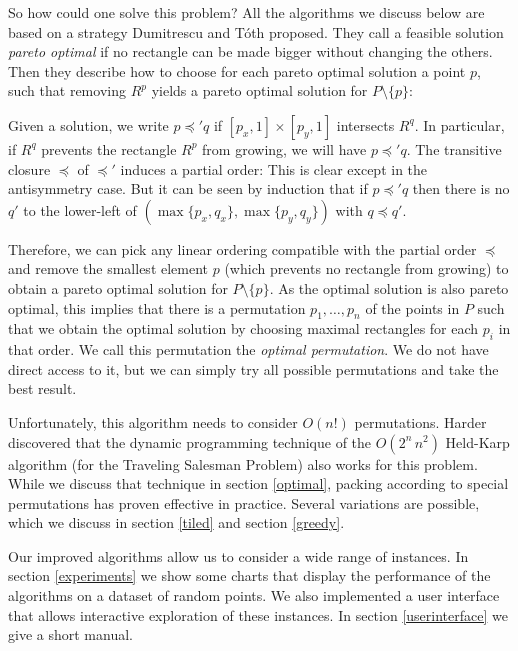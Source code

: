 \documentclass[11pt, a4paper, twocolumn]{article}
\begin{document}
So how could one solve this problem? All the algorithms we discuss below
are based on a strategy Dumitrescu and Tóth \cite{dumitrescu2015packing} proposed.
They call a feasible solution \textit{pareto optimal} if no rectangle can be
made bigger without changing the others.
Then they describe how to choose for each pareto optimal solution a point $p$,
such that removing $R^p$ yields a pareto optimal solution for $P\setminus\{p\}$:

Given a solution, we write $p \preceq' q$ if $[p_x, 1] \times [p_y, 1]$ intersects $R^q$.
In particular, if $R^q$ prevents the rectangle $R^p$ from growing, we will have $p \preceq' q$.
The transitive closure $\preceq$ of $\preceq'$ induces a partial order: This is clear except
in the antisymmetry case. But it can be seen by induction that if $p \preceq' q$ then
there is no $q'$ to the lower-left of $(\max \{p_x, q_x\}, \max \{p_y, q_y\})$ with $q \preceq q'$.


Therefore, we can pick any linear ordering compatible with the partial order $\preceq$ and
remove the smallest element $p$ (which prevents no rectangle from growing)
to obtain a pareto optimal solution for $P\setminus\{p\}$.
As the optimal solution is also pareto optimal, this implies that there is a
permutation $p_1, \dots, p_n$ of the points in $P$ such that we obtain the
optimal solution by choosing maximal rectangles for each $p_i$ in that order.
We call this permutation the \textit{optimal permutation}.
We do not have direct access to it, but we can simply try all possible
permutations and take the best result.

Unfortunately, this algorithm needs to consider $O(n!)$ permutations.
Harder \cite{harder2019anchoredrectanglecover} discovered that
the dynamic programming technique of the $O(2^n\,n^2)$ Held-Karp algorithm (for the
Traveling Salesman Problem)
also works for this problem. While we discuss that technique in section \ref{optimal},
packing according to special permutations has proven effective in practice.
Several variations are possible, which we discuss in section \ref{tiled} and section \ref{greedy}.

Our improved algorithms allow us to consider a wide range of instances.
In section \ref{experiments} we show some charts that display the performance of the algorithms
on a dataset of random points. We also implemented a user interface that allows interactive
exploration of these instances. In section \ref{userinterface} we give a short manual.
\end{document}
